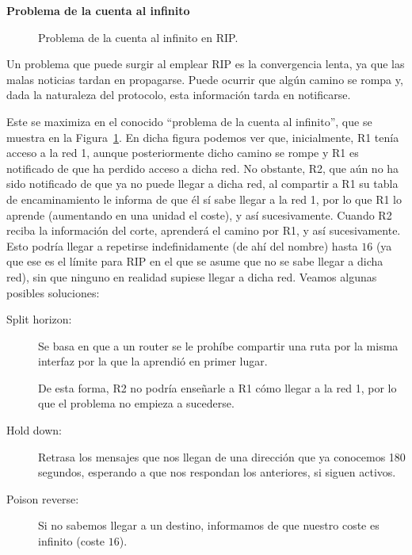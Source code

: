 \noindent\textbf{Problema de la cuenta al infinito}
\begin{figure}
    \centering
    \caption{Problema de la cuenta al infinito en \acrshort{RIP}.}
    \label{fig:rip}
\end{figure}

Un problema que puede surgir al emplear \acrshort{RIP} es la convergencia lenta, ya que las malas noticias tardan en propagarse. Puede ocurrir que algún camino se rompa y, dada la naturaleza del protocolo, esta información tarda en notificarse.

Este se maximiza en el conocido ``problema de la cuenta al infinito'', que se muestra en la Figura~\ref{fig:rip}. En dicha figura podemos ver que, inicialmente, R1 tenía acceso a la red 1, aunque posteriormente dicho camino se rompe y R1 es notificado de que ha perdido acceso a dicha red. No obstante, R2, que aún no ha sido notificado de que ya no puede llegar a dicha red, al compartir a R1 su tabla de encaminamiento le informa de que él sí sabe llegar a la red 1, por lo que R1 lo aprende (aumentando en una unidad el coste), y así sucesivamente. Cuando R2 reciba la información del corte, aprenderá el camino por R1, y así sucesivamente. Esto podría llegar a repetirse indefinidamente (de ahí del nombre) hasta $16$ (ya que ese es el límite para \acrshort{RIP} en el que se asume que no se sabe llegar a dicha red), sin que ninguno en realidad supiese llegar a dicha red. Veamos algunas posibles soluciones:
\begin{description}
    \item [Split horizon:] Se basa en que a un router se le prohíbe compartir una ruta por la misma interfaz por la que la aprendió en primer lugar.
    
    De esta forma, R2 no podría enseñarle a R1 cómo llegar a la red 1, por lo que el problema no empieza a sucederse.
    \item [Hold down:] Retrasa los mensajes que nos llegan de una dirección que ya conocemos 180 segundos, esperando a que nos respondan los anteriores, si siguen activos. 
    \item [Poison reverse:] Si no sabemos llegar a un destino, informamos de que nuestro coste es infinito (coste $16$).
\end{description}

